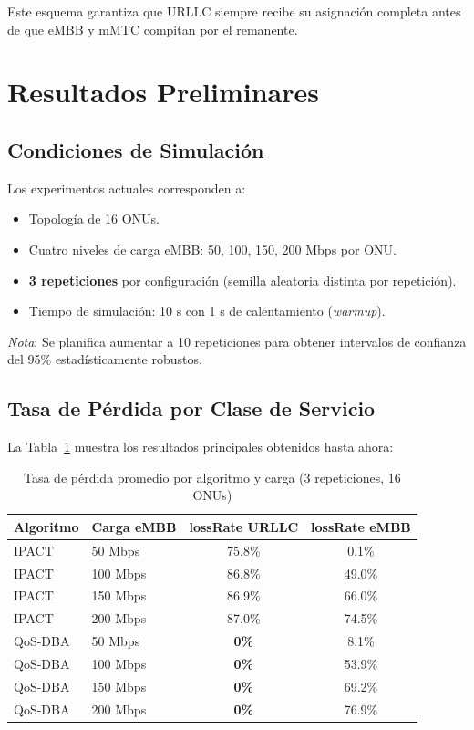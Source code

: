 \documentclass[12pt, letterpaper]{article}
\begin{document}
Este esquema garantiza que URLLC siempre recibe su asignación completa antes de que eMBB y mMTC compitan por el remanente.

\section{Resultados Preliminares}

\subsection{Condiciones de Simulación}

Los experimentos actuales corresponden a:

\begin{itemize}[leftmargin=1.5em]
  \item Topología de 16 ONUs.
  \item Cuatro niveles de carga eMBB: 50, 100, 150, 200 Mbps por ONU.
  \item \textbf{3 repeticiones} por configuración (semilla aleatoria distinta por repetición).
  \item Tiempo de simulación: 10 s con 1 s de calentamiento (\textit{warmup}).
\end{itemize}

\textit{Nota}: Se planifica aumentar a 10 repeticiones para obtener intervalos de confianza del 95\% estadísticamente robustos.

\subsection{Tasa de Pérdida por Clase de Servicio}

La Tabla~\ref{tab:lossrate} muestra los resultados principales obtenidos hasta ahora:

\begin{table}[H]
\centering
\caption{Tasa de pérdida promedio por algoritmo y carga (3 repeticiones, 16 ONUs)}
\label{tab:lossrate}
\begin{tabular}{llcc}
\toprule
\textbf{Algoritmo} & \textbf{Carga eMBB} & \textbf{lossRate URLLC} & \textbf{lossRate eMBB} \\
\midrule
IPACT   & 50 Mbps  & 75.8\% & 0.1\%  \\
IPACT   & 100 Mbps & 86.8\% & 49.0\% \\
IPACT   & 150 Mbps & 86.9\% & 66.0\% \\
IPACT   & 200 Mbps & 87.0\% & 74.5\% \\
\midrule
QoS-DBA & 50 Mbps  & \textbf{0\%} & 8.1\%  \\
QoS-DBA & 100 Mbps & \textbf{0\%} & 53.9\% \\
QoS-DBA & 150 Mbps & \textbf{0\%} & 69.2\% \\
QoS-DBA & 200 Mbps & \textbf{0\%} & 76.9\% \\
\bottomrule
\end{tabular}
\end{table}
\end{document}
